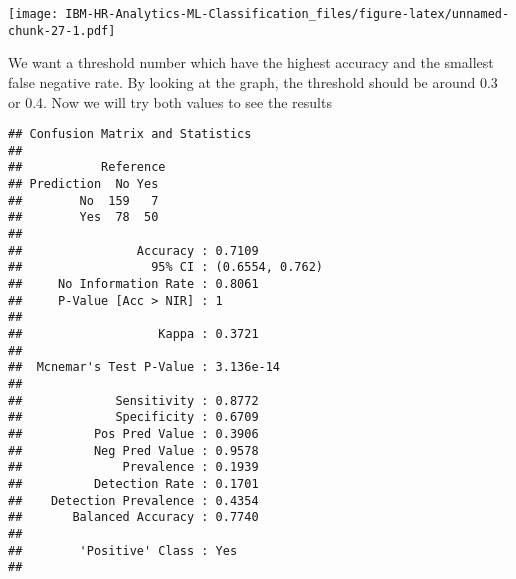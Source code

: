 \documentclass[
]{article}
\newenvironment{Shaded}{\begin{snugshade}}{\end{snugshade}}
\newcommand{\DataTypeTok}[1]{\textcolor[rgb]{0.13,0.29,0.53}{#1}}
\newcommand{\FloatTok}[1]{\textcolor[rgb]{0.00,0.00,0.81}{#1}}
\newcommand{\KeywordTok}[1]{\textcolor[rgb]{0.13,0.29,0.53}{\textbf{#1}}}
\newcommand{\NormalTok}[1]{#1}
\newcommand{\OperatorTok}[1]{\textcolor[rgb]{0.81,0.36,0.00}{\textbf{#1}}}
\newcommand{\StringTok}[1]{\textcolor[rgb]{0.31,0.60,0.02}{#1}}
\begin{document}
\texttt{[image: IBM-HR-Analytics-ML-Classification\_files/figure-latex/unnamed-chunk-27-1.pdf]}

We want a threshold number which have the highest accuracy and the
smallest false negative rate. By looking at the graph, the threshold
should be around 0.3 or 0.4. Now we will try both values to see the
results

\begin{Shaded}
\end{Shaded}

\begin{verbatim}
## Confusion Matrix and Statistics
## 
##           Reference
## Prediction  No Yes
##        No  159   7
##        Yes  78  50
##                                          
##                Accuracy : 0.7109         
##                  95% CI : (0.6554, 0.762)
##     No Information Rate : 0.8061         
##     P-Value [Acc > NIR] : 1              
##                                          
##                   Kappa : 0.3721         
##                                          
##  Mcnemar's Test P-Value : 3.136e-14      
##                                          
##             Sensitivity : 0.8772         
##             Specificity : 0.6709         
##          Pos Pred Value : 0.3906         
##          Neg Pred Value : 0.9578         
##              Prevalence : 0.1939         
##          Detection Rate : 0.1701         
##    Detection Prevalence : 0.4354         
##       Balanced Accuracy : 0.7740         
##                                          
##        'Positive' Class : Yes            
## 
\end{verbatim}

\begin{Shaded}
\end{Shaded}
\end{document}
